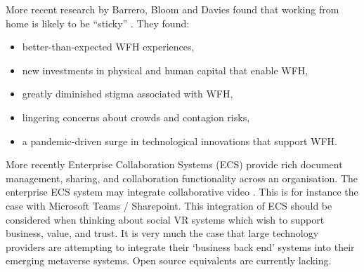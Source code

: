 More recent research by Barrero, Bloom and Davies found that working from home is likely to be ``sticky'' \cite{barrero2021working}. They found:
\begin{itemize}
\item better-than-expected WFH experiences, 
\item new investments in physical and human capital that enable WFH, 
\item greatly diminished stigma associated with WFH, 
\item lingering concerns about crowds and contagion risks,
\item a pandemic-driven surge in technological innovations that support WFH.
\end{itemize}
More recently Enterprise Collaboration Systems (ECS) provide rich document management, sharing, and collaboration functionality across an organisation. The enterprise ECS system may integrate collaborative video \cite{prakash2020characteristic}. This is for instance the case with Microsoft Teams / Sharepoint. This integration of ECS should be considered when thinking about social VR systems which wish to support business, value, and trust. It is very much the case that large technology providers are attempting to integrate their `business back end' systems into their emerging metaverse systems. Open source equivalents are currently lacking.
